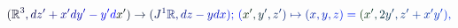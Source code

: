 \documentclass[12pt]{article}
\begin{document}
\makeatletter
\renewcommand*{\@textcolor}[3]{%
  \protect\leavevmode
  \begingroup
    \color#1{#2}#3%
  \endgroup
}
\makeatother
\begin{displaymath}
\mathcolor[RGB]{0,0,15}{(} \mathbb { \mathcolor[RGB]{0,0,30}{R} } ^ { \mathcolor[RGB]{0,0,45}{3} } \mathcolor[RGB]{0,0,60}{,} \mathcolor[RGB]{0,0,75}{d} \mathcolor[RGB]{0,0,90}{z} ^ { \mathcolor[RGB]{0,0,105}{\prime} } \mathcolor[RGB]{0,0,120}{+} \mathcolor[RGB]{0,0,135}{x} ^ { \mathcolor[RGB]{0,0,150}{\prime} } \mathcolor[RGB]{0,0,165}{d} \mathcolor[RGB]{0,0,180}{y} ^ { \mathcolor[RGB]{0,0,195}{\prime} } \mathcolor[RGB]{0,0,210}{-} \mathcolor[RGB]{0,0,225}{y} ^ { \mathcolor[RGB]{0,0,240}{\prime} } \mathcolor[RGB]{0,0,255}{d} \mathcolor[RGB]{0,15,0}{x} ^ { \mathcolor[RGB]{0,15,15}{\prime} } \mathcolor[RGB]{0,15,30}{)} \mathcolor[RGB]{0,15,45}{\to} \mathcolor[RGB]{0,15,60}{(} \mathcolor[RGB]{0,15,75}{J} ^ { \mathcolor[RGB]{0,15,90}{1} } \mathbb { \mathcolor[RGB]{0,15,105}{R} } \mathcolor[RGB]{0,15,120}{,} \mathcolor[RGB]{0,15,135}{d} \mathcolor[RGB]{0,15,150}{z} \mathcolor[RGB]{0,15,165}{-} \mathcolor[RGB]{0,15,180}{y} \mathcolor[RGB]{0,15,195}{d} \mathcolor[RGB]{0,15,210}{x} \mathcolor[RGB]{0,15,225}{)} \mathcolor[RGB]{0,15,240}{;} \mathcolor[RGB]{0,15,255}{\,
(} \mathcolor[RGB]{0,30,0}{x} ^ { \mathcolor[RGB]{0,30,15}{\prime} } \mathcolor[RGB]{0,30,30}{,} \mathcolor[RGB]{0,30,45}{y} ^ { \mathcolor[RGB]{0,30,60}{\prime} } \mathcolor[RGB]{0,30,75}{,} \mathcolor[RGB]{0,30,90}{z} ^ { \mathcolor[RGB]{0,30,105}{\prime} } \mathcolor[RGB]{0,30,120}{)} \mathcolor[RGB]{0,30,135}{\mapsto} \mathcolor[RGB]{0,30,150}{(} \mathcolor[RGB]{0,30,165}{x} \mathcolor[RGB]{0,30,180}{,} \mathcolor[RGB]{0,30,195}{y} \mathcolor[RGB]{0,30,210}{,} \mathcolor[RGB]{0,30,225}{z} \mathcolor[RGB]{0,30,240}{)} \mathcolor[RGB]{0,30,255}{=} \mathcolor[RGB]{0,45,0}{(} \mathcolor[RGB]{0,45,15}{x} ^ { \mathcolor[RGB]{0,45,30}{\prime} } \mathcolor[RGB]{0,45,45}{,} \mathcolor[RGB]{0,45,60}{2} \mathcolor[RGB]{0,45,75}{y} ^ { \mathcolor[RGB]{0,45,90}{\prime} } \mathcolor[RGB]{0,45,105}{,} \mathcolor[RGB]{0,45,120}{z} ^ { \mathcolor[RGB]{0,45,135}{\prime} } \mathcolor[RGB]{0,45,150}{+} \mathcolor[RGB]{0,45,165}{x} ^ { \mathcolor[RGB]{0,45,180}{\prime} } \mathcolor[RGB]{0,45,195}{y} ^ { \mathcolor[RGB]{0,45,210}{\prime} } \mathcolor[RGB]{0,45,225}{)} \mathcolor[RGB]{0,45,240}{,}
\end{displaymath}
\end{document}
